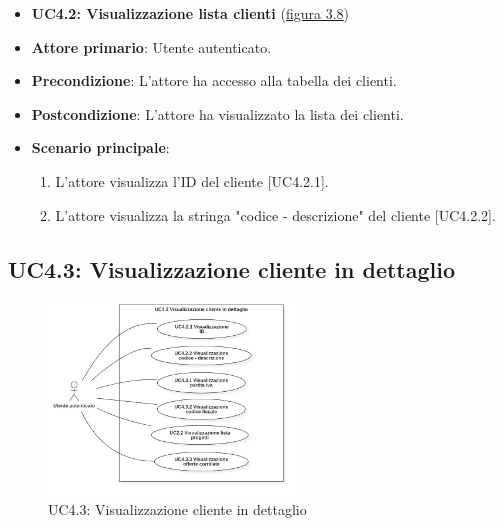 \begin{itemize}
\item \textbf{UC4.2: Visualizzazione lista clienti} ({\hyperref[fig:UC4.2]{figura 3.8}})
\item \textbf{Attore primario}: Utente autenticato.
\item \textbf{Precondizione}: L'attore ha accesso alla tabella dei clienti.
\item \textbf{Postcondizione}: L'attore ha visualizzato la lista dei clienti.
\item \textbf{Scenario principale}: 
\begin{enumerate}
\item L'attore visualizza l'ID del cliente [UC4.2.1].
\item L'attore visualizza la stringa "codice - descrizione" del cliente [UC4.2.2].
\end{enumerate}
\end{itemize}

\subsection{UC4.3: Visualizzazione cliente in dettaglio}
\begin{figure}[!h]
\centering
\includegraphics[width=250px]{../images/UC/.jpeg/UC4.3.0-visualizzazioneDettaglioCliente.jpg}
\caption{UC4.3: Visualizzazione cliente in dettaglio}
\label{fig:UC4.3}
\end{figure}

